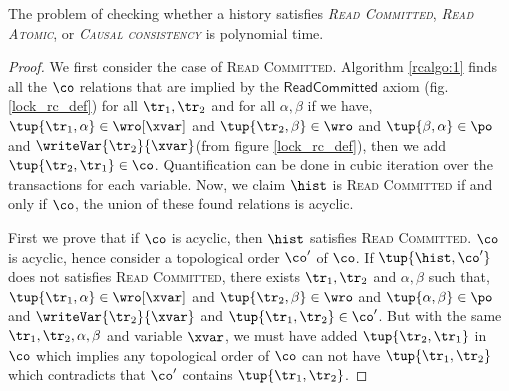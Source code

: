 \begin{theorem}
The problem of checking whether a history satisfies \emph{\textsc{Read Committed}}, \emph{\textsc{Read Atomic}}, or \emph{\textsc{Causal consistency}} is polynomial time.
\end{theorem}
\begin{proof}
 
We first consider the case of \textsc{Read Committed}. Algorithm \ref{rcalgo:1} finds all the $\co$ relations that are implied by the $\mathsf{Read Committed}$ axiom (fig. \ref{lock_rc_def}) \ie for all $\tr_1, \tr_2$ and for all $\alpha, \beta$ if we have, $\tup{\tr_1, \alpha} \in \wro[\xvar]$ and $\tup{\tr_2, \beta} \in \wro$ and $\tup{\beta, \alpha} \in \po$ and $\writeVar{\tr_2}{\xvar}$(from figure \ref{lock_rc_def}), then we add $\tup{\tr_2, \tr_1} \in \co$. Quantification can be done in cubic iteration over the transactions for each variable. Now, we claim $\hist$ is \textsc{Read Committed} if and only if $\co$, the union of these found relations is acyclic. 
 
  First we prove that if $\co$ is acyclic, then $\hist$ satisfies \textsc{Read Committed}. $\co$ is acyclic, hence consider a topological order $\co'$ of $\co$. If $\tup{\hist, \co'}$ does not satisfies \textsc{Read Committed}, there exists $\tr_1, \tr_2$ and $\alpha, \beta$ such that, $\tup{\tr_1, \alpha} \in \wro[\xvar]$ and $\tup{\tr_2, \beta} \in \wro$ and $\tup{\alpha, \beta} \in \po$ and $\writeVar{\tr_2}{\xvar}$ and $\tup{\tr_1, \tr_2} \in \co'$. But with the same $\tr_1, \tr_2, \alpha, \beta$ and variable $\xvar$, we must have added $\tup{\tr_2, \tr_1}$ in $\co$ which implies any topological order of $\co$ can not have $\tup{\tr_1, \tr_2}$ which contradicts that $\co'$ contains $\tup{\tr_1, \tr_2}$.
 

\end{proof}
